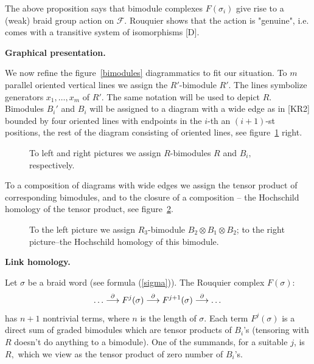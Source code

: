 \documentclass[12pt]{article}
\begin{document}
The above proposition says that bimodule complexes $F(\sigma_i)$ 
give rise to a (weak) braid group action on $\mathcal{F}.$ Rouquier 
shows that the action is "genuine", i.e. comes with a transitive 
system of isomorphisms [D]. 

\vspace{0.2in} 

{\bf Graphical presentation.} 

\noindent 
We now refine the figure~\ref{bimodules} diagrammatics to fit our
situation. 
To $m$ parallel oriented vertical lines we assign the $R'$-bimodule $R'.$ 
The lines symbolize generators $x_1, \dots, x_m$ of $R'.$ The same 
notation will be used to depict $R.$ Bimodules $B_i'$ and $B_i$ will be
assigned to a diagram with a wide edge as in [KR2] bounded by four 
oriented lines with endpoints in the $i$-th an $(i+1)$-st positions, the 
rest of the diagram consisting of oriented lines, see figure~\ref{lines} right. 

\begin{figure}  \caption{To left and right pictures we 
assign $R$-bimodules $R$ and $B_i,$ respectively.} \label{lines}
\end{figure} 

To a composition of diagrams with wide edges we assign the tensor 
product of corresponding bimodules, and to the closure of a composition -- 
the Hochschild homology of the tensor product, see figure~\ref{product}.  

\begin{figure} \caption{To the 
left picture we assign  $R_3$-bimodule $B_2\otimes B_1 \otimes B_2$; 
to the right picture--the Hochschild homology of this bimodule.} 
\label{product} 
\end{figure} 



\vspace{0.2in} 

{\bf Link homology.} 

\noindent 
Let $\sigma$ be a braid word (see formula (\ref{sigma})). The Rouquier 
complex $F(\sigma)$:  
$$ \dots \stackrel{\partial}{\longrightarrow} F^j(\sigma) \stackrel{\partial}{\longrightarrow} 
F^{j+1}(\sigma) \stackrel{\partial}{\longrightarrow} \dots $$ 
has $n+1$ nontrivial terms, where $n$ is the length of $\sigma.$ 
Each term $F^j(\sigma)$ is a direct sum of graded bimodules 
which are tensor products of $B_i$'s (tensoring with $R$ doesn't do 
anything to a bimodule). One of the summands, for a suitable $j$, is 
$R,$ which we view as the tensor product of zero number of $B_i$'s. 
\end{document}
